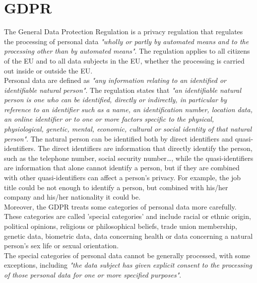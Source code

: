 \section{GDPR}
The General Data Protection Regulation\cite{european_commission_regulation_2016} is a privacy regulation that regulates the processing of personal data \textit{"wholly or partly by automated means and to the processing other than by automated means"}. The regulation applies to all citizens of the EU and to all data subjects in the EU, whether the processing is carried out inside or outside the EU. \\
Personal data are defined as \textit{"any information relating to an identified or identifiable natural person"}. The regulation states that \textit{"an identifiable natural person is one who can be identified, directly or indirectly, in particular by reference to an identifier such as a name, an identification number, location data, an online identifier or to one or more factors specific to the physical, physiological, genetic, mental, economic, cultural or social identity of that natural person"}. The natural person can be identified both by direct identifiers and quasi-identifiers. The direct identifiers are information that directly identify the person, such as the telephone number, social security number\dots, while the quasi-identifiers are information that alone cannot identify a person, but if they are combined with other quasi-identifiers can affect a person's privacy. For example, the job title could be not enough to identify a person, but combined with his/her company and his/her nationality it could be. \\
Moreover, the GDPR treats some categories of personal data more carefully. These categories are called 'special categories' and include racial or ethnic origin, political opinions, religious or philosophical beliefs, trade union membership, genetic data, biometric data, data concerning health or data concerning a natural person's sex life or sexual orientation.\\
The special categories of personal data cannot be generally processed, with some exceptions, including \textit{"the data subject has given explicit consent to the processing of those personal data for one or more specified purposes"}.\\

